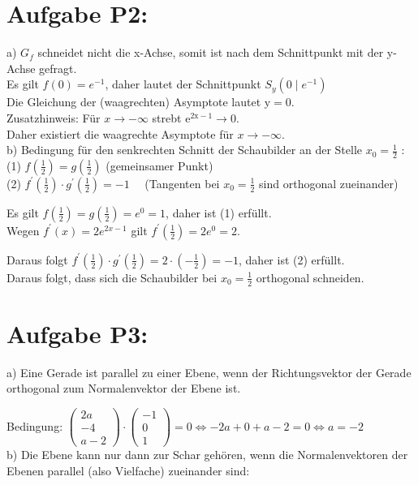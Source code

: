 \documentclass[10pt]{article}
\begin{document}
\section*{Aufgabe P2:}
a) $G_{f}$ schneidet nicht die x-Achse, somit ist nach dem Schnittpunkt mit der y-Achse gefragt.\\
Es gilt $f(0)=e^{-1}$, daher lautet der Schnittpunkt $S_{y}\left(0 \mid e^{-1}\right)$\\
Die Gleichung der (waagrechten) Asymptote lautet $\mathrm{y}=0$.\\
Zusatzhinweis: Für $x \rightarrow-\infty$ strebt $\mathrm{e}^{2 \mathrm{x}-1} \rightarrow 0$.\\
Daher existiert die waagrechte Asymptote für $x \rightarrow-\infty$.\\
b) Bedingung für den senkrechten Schnitt der Schaubilder an der Stelle $x_{0}=\frac{1}{2}$ :\\
(1) $f\left(\frac{1}{2}\right)=g\left(\frac{1}{2}\right)$ (gemeinsamer Punkt)\\
(2) $f^{\prime}\left(\frac{1}{2}\right) \cdot g^{\prime}\left(\frac{1}{2}\right)=-1 \quad$ (Tangenten bei $x_{0}=\frac{1}{2}$ sind orthogonal zueinander)

Es gilt $f\left(\frac{1}{2}\right)=g\left(\frac{1}{2}\right)=e^{0}=1$, daher ist (1) erfüllt.\\
Wegen $f^{\prime}(x)=2 e^{2 x-1}$ gilt $f^{\prime}\left(\frac{1}{2}\right)=2 e^{0}=2$.

Daraus folgt $f^{\prime}\left(\frac{1}{2}\right) \cdot g^{\prime}\left(\frac{1}{2}\right)=2 \cdot\left(-\frac{1}{2}\right)=-1$, daher ist (2) erfüllt.\\
Daraus folgt, dass sich die Schaubilder bei $x_{0}=\frac{1}{2}$ orthogonal schneiden.

\section*{Aufgabe P3:}
a) Eine Gerade ist parallel zu einer Ebene, wenn der Richtungsvektor der Gerade orthogonal zum Normalenvektor der Ebene ist.

Bedingung: $\left(\begin{array}{c}2 a \\ -4 \\ a-2\end{array}\right) \cdot\left(\begin{array}{c}-1 \\ 0 \\ 1\end{array}\right)=0 \Leftrightarrow-2 a+0+a-2=0 \Leftrightarrow a=-2$\\
b) Die Ebene kann nur dann zur Schar gehören, wenn die Normalenvektoren der Ebenen parallel (also Vielfache) zueinander sind:
\end{document}
